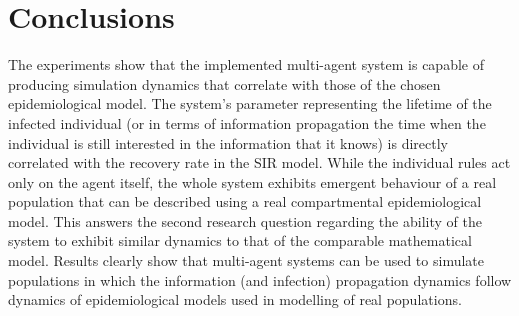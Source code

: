 \section{Conclusions}

The experiments show that the implemented multi-agent system is capable of producing simulation dynamics that correlate with those of the chosen epidemiological model.
The system's parameter representing the lifetime of the infected individual (or in terms of information propagation the time when the individual is still interested in the information that it knows) is directly correlated with the recovery rate in the SIR model.
While the individual rules act only on the agent itself, the whole system exhibits emergent behaviour of a real population that can be described using a real compartmental epidemiological model.
This answers the second research question regarding the ability of the system to exhibit similar dynamics to that of the comparable mathematical model.
Results clearly show that multi-agent systems can be used to simulate populations in which the information (and infection) propagation dynamics follow dynamics of epidemiological models used in modelling of real populations.